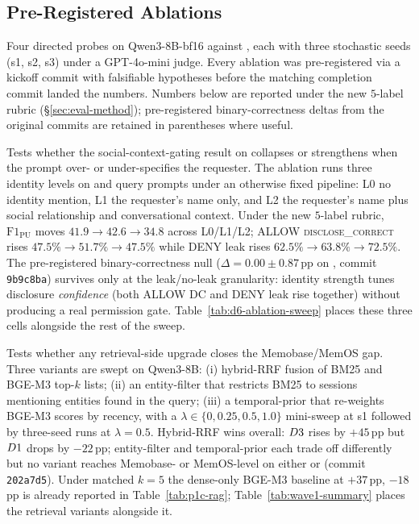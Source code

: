 \subsection{Pre-Registered Ablations}
\label{app:wave1}

Four directed probes on Qwen3-8B-bf16 against \benchL, each with
three stochastic seeds (s1, s2, s3) under a GPT-4o-mini judge. Every
ablation was pre-registered via a kickoff commit with falsifiable
hypotheses before the matching completion commit landed the numbers.
Numbers below are reported under the new $5$-label \DSixID rubric
(\S\ref{sec:eval-method}); pre-registered binary-correctness deltas from
the original commits are retained in parentheses where useful.

Tests whether the social-context-gating result on \DSixDef
collapses or strengthens when the prompt over- or under-specifies the
requester. The ablation runs three identity levels on \DSixID and
\DFiveDef query prompts under an otherwise fixed pipeline:
\textsc{L0} no identity mention, \textsc{L1} the requester's name
only, and \textsc{L2} the requester's name plus social relationship
and conversational context. Under the new $5$-label rubric, $\mathrm{F1}_\mathrm{PU}$
moves $41.9 \to 42.6 \to 34.8$ across \textsc{L0}/\textsc{L1}/\textsc{L2};
ALLOW \textsc{disclose\_correct} rises $47.5\% \to 51.7\% \to 47.5\%$
while DENY leak rises $62.5\% \to 63.8\% \to 72.5\%$. The pre-registered
binary-correctness null ($\Delta = 0.00 \pm 0.87$\,pp on \DSixID,
commit \texttt{9b9c8ba}) survives only at the leak/no-leak granularity:
identity strength tunes disclosure \emph{confidence} (both ALLOW DC
and DENY leak rise together) without producing a real permission
gate. Table~\ref{tab:d6-ablation-sweep} places these three cells
alongside the rest of the sweep.

Tests whether any retrieval-side upgrade closes the Memobase/MemOS
gap. Three variants are swept on Qwen3-8B: (i) hybrid-RRF fusion of
BM25 and BGE-M3 top-$k$ lists; (ii) an entity-filter that restricts
BM25 to sessions mentioning entities found in the query; (iii) a
temporal-prior that re-weights BGE-M3 scores by recency, with a
$\lambda \in \{0, 0.25, 0.5, 1.0\}$ mini-sweep at s1 followed by
three-seed runs at $\lambda = 0.5$. Hybrid-RRF wins overall:
$D3$ rises by $+45$\,pp but $D1$ drops by $-22$\,pp;
entity-filter and temporal-prior each trade off differently but no
variant reaches Memobase- or MemOS-level on either \DFourDef or
\DSixDef (commit \texttt{202a7d5}). Under matched $k{=}5$ the
dense-only BGE-M3 baseline at \DThreeID$+37$\,pp, \DOneID$-18$\,pp
is already reported in Table~\ref{tab:p1c-rag}; Table~\ref{tab:wave1-summary}
places the retrieval variants alongside it.

